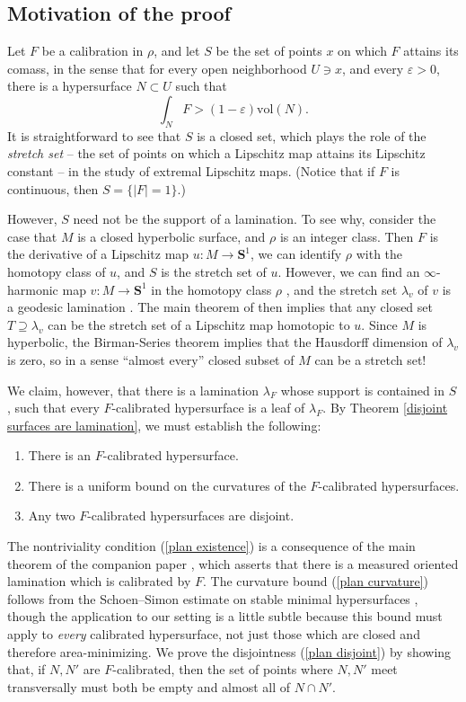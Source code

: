 \documentclass[reqno,11pt]{amsart}
\newcommand{\Sph}{\mathbf S}
\newcommand{\vol}{\mathrm{vol}}
\newcommand{\dfn}[1]{\emph{#1}\index{#1}}
\theoremstyle{definition}
\numberwithin{equation}{section}
\begin{document}
\subsection{Motivation of the proof}
Let $F$ be a calibration in $\rho$, and let $S$ be the set of points $x$ on which $F$ attains its comass, in the sense that for every open neighborhood $U \ni x$, and every $\varepsilon > 0$, there is a hypersurface $N \subset U$ such that 
$$\int_N F > (1 - \varepsilon) \vol(N).$$
It is straightforward to see that $S$ is a closed set, which plays the role of the \dfn{stretch set} -- the set of points on which a Lipschitz map attains its Lipschitz constant -- in the study of extremal Lipschitz maps. 
(Notice that if $F$ is continuous, then $S = \{|F| = 1\}$.)

However, $S$ need not be the support of a lamination.
To see why, consider the case that $M$ is a closed hyperbolic surface, and $\rho$ is an integer class.
Then $F$ is the derivative of a Lipschitz map $u: M \to \Sph^1$, we can identify $\rho$ with the homotopy class of $u$, and $S$ is the stretch set of $u$.
However, we can find an $\infty$-harmonic map $v: M \to \Sph^1$ in the homotopy class $\rho$ \cite[Theorem 2.4]{daskalopoulos2020transverse}, and the stretch set $\lambda_v$ of $v$ is a geodesic lamination \cite[Theorem 5.2]{daskalopoulos2020transverse}.
The main theorem of \cite{backus2024lipschitz} then implies that any closed set $T \supseteq \lambda_v$ can be the stretch set of a Lipschitz map homotopic to $u$.
Since $M$ is hyperbolic, the Birman-Series theorem implies that the Hausdorff dimension of $\lambda_v$ is zero, so in a sense ``almost every'' closed subset of $M$ can be a stretch set!

We claim, however, that there is a lamination $\lambda_F$ whose support is contained in $S$, such that every $F$-calibrated hypersurface is a leaf of $\lambda_F$.
By Theorem \ref{disjoint surfaces are lamination}, we must establish the following:
\begin{enumerate}
\item There is an $F$-calibrated hypersurface. \label{plan existence}
\item There is a uniform bound on the curvatures of the $F$-calibrated hypersurfaces. \label{plan curvature}
\item Any two $F$-calibrated hypersurfaces are disjoint. \label{plan disjoint}
\end{enumerate}
The nontriviality condition (\ref{plan existence}) is a consequence of the main theorem of the companion paper \cite{BackusBest1}, which asserts that there is a measured oriented lamination which is calibrated by $F$.
The curvature bound (\ref{plan curvature}) follows from the Schoen--Simon estimate on stable minimal hypersurfaces \cite{Schoen81}, though the application to our setting is a little subtle because this bound must apply to \emph{every} calibrated hypersurface, not just those which are closed and therefore area-minimizing.
We prove the disjointness (\ref{plan disjoint}) by showing that, if $N, N'$ are $F$-calibrated, then the set of points where $N, N'$ meet transversally must both be empty and almost all of $N \cap N'$.
\end{document}
